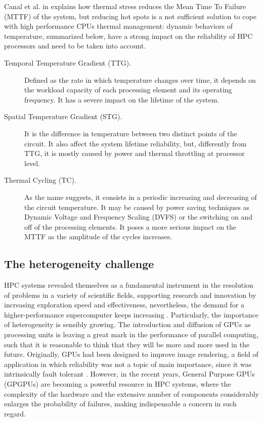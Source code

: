 Canal et al. in \cite{10.1145/3403956} explains how thermal stress reduces the Mean Time To Failure (MTTF) of the system, but reducing hot spots is a not sufficient solution to cope with high performance CPUs thermal management: dynamic behaviors of temperature, summarized below, have a strong impact on the reliability of HPC processors and need to be taken into account.
\begin{description}
\item[Temporal Temperature Gradient (TTG).] Defined as the rate in which temperature changes over time, it depends on the workload capacity of each processing element and its operating frequency. It has a severe impact on the lifetime of the system.
\item[Spatial Temperature Gradient (STG).] It is the difference in temperature between two distinct points of the circuit. It also affect the system lifetime reliability, but, differently from TTG, it is mostly caused by power and thermal throttling at processor level.
\item[Thermal Cycling (TC).] As the name suggests, it consists in a periodic increasing and decreasing of the circuit temperature. It may be caused by power saving techniques as Dynamic Voltage and Frequency Scaling (DVFS) or the switching on and off of the processing elements. It poses a more serious impact on the MTTF as the amplitude of the cycles increases.
\end{description}

\subsection{The heterogeneity challenge}
HPC systems revealed themselves as a fundamental instrument in the resolution of problems in a variety of scientific fields, supporting research and innovation  by increasing exploration speed and effectiveness, nevertheless, the demand for a higher-performance supercomputer keeps increasing \cite{10.1145/3372790}. Particularly, the importance of heterogeneity is sensibly growing. The introduction and diffusion of GPUs as processing units is leaving a great mark in the performance of parallel computing, such that it is reasonable to think that they will be more and more used in the future. Originally, GPUs had been designed to improve image rendering, a field of application in which reliability was not a topic of main importance, since it was intrinsically fault tolerant \cite{Fang12evaluatingthe}. However, in the recent years, General Purpose GPUs (GPGPUs) are becoming a powerful resource in HPC systems, where the complexity of the hardware and the extensive number of components  considerably enlarges the probability of failures, making indispensable a concern in such regard.

